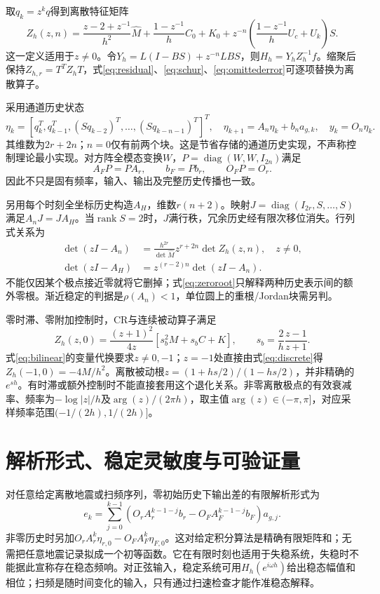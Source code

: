 \documentclass[UTF8,11pt,a4paper]{ctexart}
\begin{document}
取$q_k=z^kq$得到离散特征矩阵
\begin{equation}\label{eq:discrete}
 Z_h(z,n)=\frac{z-2+z^{-1}}{h^2}\widehat M
 +\frac{1-z^{-1}}h C_0+K_0
 +z^{-n}\left(\frac{1-z^{-1}}h U_c+U_k\right)S.
\end{equation}
这一定义适用于$z\ne0$。令$Y_h=L(I-BS)+z^{-n}LBS$，则$H_h=Y_h Z_h^{-1}f$。缩聚后保持$Z_{h,r}=T^TZ_hT$，式\eqref{eq:residual}、\eqref{eq:schur}、\eqref{eq:omittederror}可逐项替换为离散算子。

采用通道历史状态
\begin{equation}\label{eq:state}
 \eta_k=[q_k^T,q_{k-1}^T,(Sq_{k-2})^T,\ldots,(Sq_{k-n-1})^T]^T,
 \quad\eta_{k+1}=A_n\eta_k+b_n a_{g,k},\quad y_k=O_n\eta_k.
\end{equation}
其维数为$2r+2n$；$n=0$仅有前两个块。这是节省存储的通道历史实现，不声称控制理论最小实现。对方阵全模态变换$W$，$P=\operatorname{diag}(W,W,I_{2n})$满足
\begin{equation}\label{eq:similarity}
 A_FP=PA_r,\qquad b_F=Pb_r,\qquad O_FP=O_r.
\end{equation}
因此不只是固有频率，输入、输出及完整历史传播也一致。

另用每个时刻全坐标历史构造$A_H$，维数$r(n+2)$。映射$J=\operatorname{diag}(I_{2r},S,\ldots,S)$满足$A_nJ=JA_H$。当$\operatorname{rank}S=2$时，$J$满行秩，冗余历史经有限次移位消失。行列式关系为
\begin{align}
 \det(zI-A_n)&=\frac{h^{2r}}{\det\widehat M}
 z^{r+2n}\det Z_h(z,n),\quad z\ne0,\label{eq:det}\\
 \det(zI-A_H)&=z^{(r-2)n}\det(zI-A_n).\label{eq:zeroroot}
\end{align}
不能仅因某个极点接近零就将它删掉；式\eqref{eq:zeroroot}只解释两种历史表示间的额外零根。渐近稳定的判据是$\rho(A_n)<1$，单位圆上的重根/Jordan块需另判。

零时滞、零附加控制时，CR与连续被动算子满足
\begin{equation}\label{eq:bilinear}
 Z_h(z,0)=\frac{(z+1)^2}{4z}
 [s_b^2M+s_bC+K],\qquad s_b=\frac2h\frac{z-1}{z+1}.
\end{equation}
式\eqref{eq:bilinear}的变量代换要求$z\ne0,-1$；$z=-1$处直接由式\eqref{eq:discrete}得$Z_h(-1,0)=-4M/h^2$。离散被动根$z=(1+hs/2)/(1-hs/2)$，并非精确的$e^{sh}$。有时滞或额外控制时不能直接套用这个退化关系。非零离散极点的有效衰减率、频率为$-\log|z|/h$及$\arg(z)/(2\pi h)$，取主值$\arg(z)\in(-\pi,\pi]$，对应采样频率范围$(-1/(2h),1/(2h)]$。

\section{解析形式、稳定灵敏度与可验证量}
对任意给定离散地震或扫频序列，零初始历史下输出差的有限解析形式为
\begin{equation}\label{eq:convolution}
 e_k=\sum_{j=0}^{k-1}
 (O_r A_r^{k-1-j}b_r-O_F A_F^{k-1-j}b_F)a_{g,j}.
\end{equation}
非零历史时另加$O_rA_r^k\eta_{r,0}-O_FA_F^k\eta_{F,0}$。这对给定积分算法是精确有限矩阵和；无需把任意地震记录拟成一个初等函数。它在有限时刻也适用于失稳系统，失稳时不能据此宣称存在稳态频响。对正弦输入，稳定系统可用$H_h(e^{i\omega h})$给出稳态幅值和相位；扫频是随时间变化的输入，只有通过扫速检查才能作准稳态解释。
\end{document}
